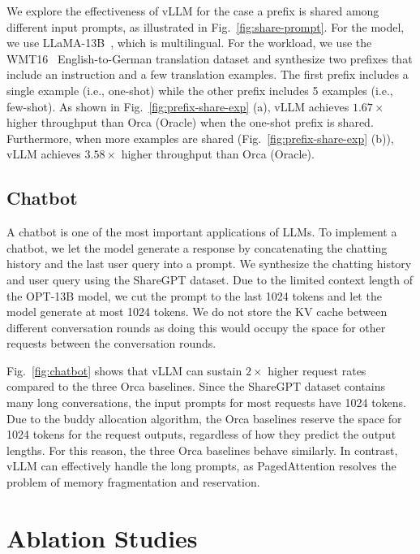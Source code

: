 We explore the effectiveness of vLLM for the case a prefix is shared among different input prompts, as illustrated in Fig.~\ref{fig:share-prompt}.
For the model, we use LLaMA-13B~\cite{touvron2023llama}, which is multilingual. For the workload, we use the WMT16~\cite{bojar-EtAl:2016:WMT1} English-to-German translation dataset and synthesize two prefixes that include an instruction and a few translation examples. The first prefix includes a single example (i.e., one-shot) while the other prefix includes 5 examples (i.e., few-shot). As shown in Fig.~\ref{fig:prefix-share-exp} (a), vLLM achieves $1.67 \times$ higher throughput than Orca (Oracle) when the one-shot prefix is shared. Furthermore, when more examples are shared (Fig.~\ref{fig:prefix-share-exp} (b)), vLLM achieves $3.58 \times$ higher throughput than Orca (Oracle).

\subsection{Chatbot}
\label{sec:chatbot}
A chatbot \cite{chatgpt, bard, vicuna2023} is one of the most important applications of LLMs. To implement a chatbot, we let the model generate a response by concatenating the chatting history and the last user query into a prompt. We synthesize the chatting history and user query using the ShareGPT dataset. Due to the limited context length of the OPT-13B model, we cut the prompt to the last 1024 tokens and let the model generate at most 1024 tokens. We do not store the KV cache between different conversation rounds as doing this would occupy the space for other requests between the conversation rounds.

Fig.~\ref{fig:chatbot} shows that vLLM can sustain $2\times$ higher request rates compared to the three Orca baselines. Since the ShareGPT dataset contains many long conversations, the input prompts for most requests have 1024 tokens. Due to the buddy allocation algorithm, the Orca baselines reserve the space for 1024 tokens for the request outputs, regardless of how they predict the output lengths. For this reason, the three Orca baselines behave similarly. In contrast, vLLM can effectively handle the long prompts, as PagedAttention resolves the problem of memory fragmentation and reservation.

\section{Ablation Studies}

